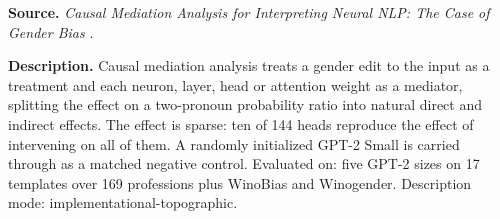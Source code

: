 
\textbf{Source.} \emph{Causal Mediation Analysis for Interpreting Neural NLP: The Case of Gender Bias} \citep{vig2020gender}.

\textbf{Description.} Causal mediation analysis treats a gender edit to the input as a treatment and each neuron, layer, head or attention weight as a mediator, splitting the effect on a two-pronoun probability ratio into natural direct and indirect effects. The effect is sparse: ten of 144 heads reproduce the effect of intervening on all of them. A randomly initialized GPT-2 Small is carried through as a matched negative control. Evaluated on: five GPT-2 sizes on 17 templates over 169 professions plus WinoBias and Winogender. Description mode: implementational-topographic.

